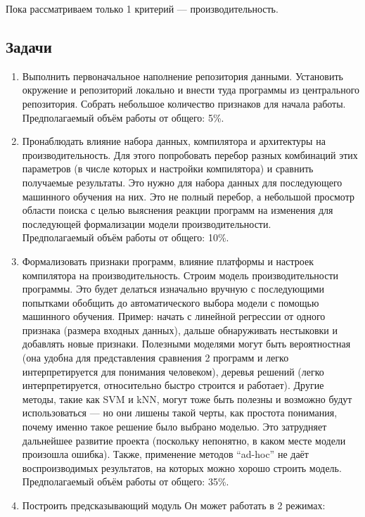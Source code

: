 Пока рассматриваем только 1 критерий --- производительность.

\subsection{Задачи}
\begin{enumerate}
\item {Выполнить первоначальное наполнение репозитория данными.
Установить окружение и репозиторий локально и внести туда программы из центрального репозитория.
Собрать небольшое количество признаков для начала работы.\\
Предполагаемый объём работы от общего: 5\%.}
\item {Пронаблюдать влияние набора данных, компилятора и архитектуры на производительность. 
Для этого попробовать перебор разных комбинаций этих параметров (в числе которых и настройки компилятора) и сравнить получаемые результаты. Это нужно для набора данных для последующего машинного обучения на них. 
Это не полный перебор, а небольшой просмотр области поиска с целью выяснения реакции программ на изменения для последующей формализации модели производительности.\\
Предполагаемый объём работы от общего: 10\%.}
\item {Формализовать признаки программ, влияние платформы и настроек компилятора на производительность.
Строим модель производительности программы. Это будет делаться изначально вручную с последующими попытками обобщить до автоматического выбора модели с помощью машинного обучения. Пример: начать с линейной регрессии от одного признака (размера входных данных), дальше обнаруживать нестыковки и добавлять новые признаки.
Полезными моделями могут быть вероятностная (она удобна для представления сравнения 2 программ и легко интерпретируется для понимания человеком), деревья решений (легко интерпретируется, относительно быстро строится и работает).
Другие методы, такие как SVM и kNN, могут тоже быть полезны и возможно будут использоваться — но они лишены такой черты, как простота понимания, почему именно такое решение было выбрано моделью. Это затрудняет дальнейшее развитие проекта (поскольку непонятно, в каком месте модели произошла ошибка). Также, применение методов “ad-hoc” не даёт воспроизводимых результатов, на которых можно хорошо строить модель.\\
Предполагаемый объём работы от общего: 35\%.}
\item {Построить предсказывающий модуль
Он может работать в 2 режимах:
	\begin{enumerate}

\end{enumerate}}
\end{enumerate}

